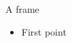 \begin{standardframe}{A frame}
	\begin{itemize}
		\item First point
	\end{itemize}
\end{standardframe}
